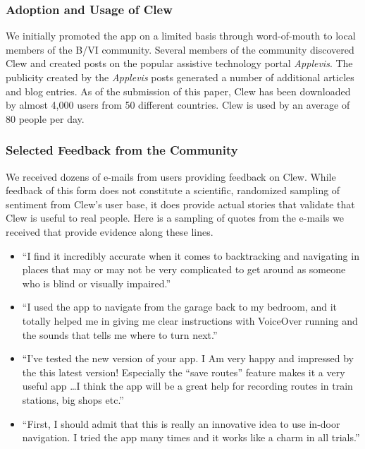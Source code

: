 \documentclass[chi]{sigchi}
\newcommand{\BVI}{B/VI\xspace}
\begin{document}
\subsubsection{Adoption and Usage of Clew}

We initially promoted the app on a limited basis through word-of-mouth to local members of the \BVI community.  Several members of the community discovered Clew and created posts on the popular assistive technology portal \emph{Applevis}.  The publicity created by the \emph{Applevis} posts generated a number of additional articles and blog entries.  As of the submission of this paper, Clew has been downloaded by almost 4,000 users from 50 different countries.  Clew is used by an average of 80 people per day.

\subsubsection{Selected Feedback from the Community}
We received dozens of e-mails from users providing feedback on Clew.  While feedback of this form does not constitute a scientific, randomized sampling of sentiment from Clew's user base, it does provide actual stories that validate that Clew is useful to real people.  Here is a sampling of quotes from the e-mails we received that provide evidence along these lines.

\begin{itemize}
\item ``I find it incredibly accurate when it comes to backtracking and navigating in places that may or may not be very complicated to get around as someone who is blind or visually impaired.''
\item ``I used the app to navigate from the garage back to my bedroom, and it totally helped me in giving me clear instructions with VoiceOver running and the sounds that tells me where to turn next.''
\item ``I've tested the new version of your app.  I Am very happy and impressed by the this latest version!  Especially the “save routes” feature makes it a very useful app \ldots I think the app will be a great help for recording routes in train stations, big shops etc.''
\item ``First, I should admit that this is really an innovative idea to
use in-door navigation. I tried the app many times and it works like a
charm in all trials.''
\end{itemize}
\end{document}
